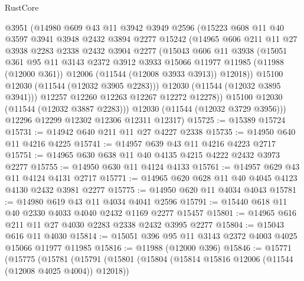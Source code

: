 \begin{lexlean}{RustCore}
\begin{coremodule}
            @3951
            (@14980
              @609
              @43
              @11
              @3942
              @3949
              @2596
              (@15223
                @608
                @11
                @40
                @3597
                @3941
                @3948
                @2432
                @3894
                @2277
                @15242
                (@14965
                  @606
                  @211
                  @11
                  @27
                  @3938
                  @2283
                  @2338
                  @2432
                  @3904
                  @2277
                  (@15043
                    @606
                    @11
                    @3938
                    (@15051
                      @361
                      @95
                      @11
                      @3143
                      @2372
                      @3912
                      @3933
                      @15066
                      @11977
                      @11985
                      (@11988 (@12000 @361))
                      @12006
                      (@11544 (@12008 @3933 @3913))
                      @12018))
                  @15100
                  @12030
                  (@11544 (@12032 @3905 @2283)))
                @12030
                (@11544 (@12032 @3895 @3941)))
              @12257
              @12260
              @12263
              @12267
              @12272
              @12278))
          @15100
          @12030
          (@11544 (@12032 @3887 @2283)))
        @12030
        (@11544 (@12032 @3729 @3956)))
      @12296
      @12299
      @12302
      @12306
      @12311
      @12317)
@15725 := @15389 @15724
@15731 := @14942 @640 @211 @11 @27 @4227 @2338
@15735 := @14950 @640 @11 @4216 @4225
@15741 := @14957 @639 @43 @11 @4216 @4223 @2717
@15751 := @14965 @630 @638 @11 @40 @4135 @4215 @4222 @2432 @3973 @2277
@15755 := @14950 @630 @11 @4124 @4133
@15761 := @14957 @629 @43 @11 @4124 @4131 @2717
@15771 := @14965 @620 @628 @11 @40 @4045 @4123 @4130 @2432 @3981 @2277
@15775 := @14950 @620 @11 @4034 @4043
@15781 := @14980 @619 @43 @11 @4034 @4041 @2596
@15791 := @15440 @618 @11 @40 @2330 @4033 @4040 @2432 @1169 @2277 @15457
@15801 := @14965 @616 @211 @11 @27 @4030 @2283 @2338 @2432 @3995 @2277
@15804 := @15043 @616 @11 @4030
@15814 := @15051 @396 @95 @11 @3143 @2372 @4003 @4025 @15066 @11977 @11985
@15816 := @11988 (@12000 @396)
@15846 := @15771
    (@15775
      (@15781
        (@15791
          (@15801
            (@15804 (@15814 @15816 @12006 (@11544 (@12008 @4025 @4004)) @12018))

\end{coremodule}
\end{lexlean}
